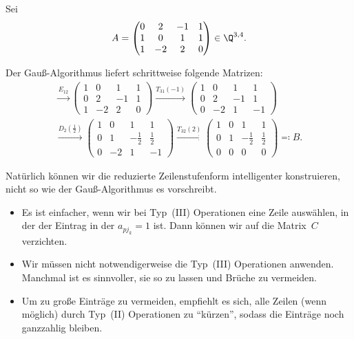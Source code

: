 \documentclass[a4paper]{article}
\begin{document}
\begin{example}
    Sei
    \begin{equation*}
        A = \begin{pmatrix}
            0 & 2  & -1 & 1 \\
            1 & 0  & 1  & 1 \\
            1 & -2 & 2  & 0
        \end{pmatrix} \in \Q^{3, 4}.
    \end{equation*}

    Der Gauß-Algorithmus liefert schrittweise folgende Matrizen:
    \begin{gather*}
        \xrightarrow{E_{12}}
        \begin{pmatrix}
            1 & 0  & 1  & 1 \\
            0 & 2  & -1 & 1 \\
            1 & -2 & 2  & 0
        \end{pmatrix}
        \xrightarrow{T_{31}(-1)}
        \begin{pmatrix}
            1 & 0  & 1  & 1  \\
            0 & 2  & -1 & 1  \\
            0 & -2 & 1  & -1
        \end{pmatrix} \\
        \xrightarrow{D_2(\frac{1}{2})}
        \begin{pmatrix}
            1 & 0  & 1            & 1           \\
            0 & 1  & -\frac{1}{2} & \frac{1}{2} \\
            0 & -2 & 1            & -1
        \end{pmatrix}
        \xrightarrow{T_{32}(2)}
        \begin{pmatrix}
            1 & 0 & 1            & 1           \\
            0 & 1 & -\frac{1}{2} & \frac{1}{2} \\
            0 & 0 & 0            & 0
        \end{pmatrix}
        \eqqcolon B.
    \end{gather*}
\end{example}

Natürlich können wir die reduzierte Zeilenstufenform intelligenter konstruieren, nicht so wie der Gauß-Algorithmus es vorschreibt.
\begin{itemize}
    \item Es ist einfacher, wenn wir bei Typ~(III) Operationen eine Zeile auswählen, in der der Eintrag in der $a_{pj_k} = 1$ ist. Dann können wir auf die Matrix~$C$ verzichten.
    \item Wir müssen nicht notwendigerweise die Typ~(III) Operationen anwenden. Manchmal ist es sinnvoller, sie so zu lassen und Brüche zu vermeiden.
    \item Um zu große Einträge zu vermeiden, empfiehlt es sich, alle Zeilen (wenn möglich) durch Typ~(II) Operationen zu "`kürzen"', sodass die Einträge noch ganzzahlig bleiben.
\end{itemize}
\end{document}
